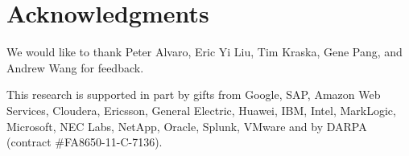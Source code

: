 \documentclass[preprint]{acm_proc_article-sp}
\begin{document}

\section{Acknowledgments}
We would like to thank Peter Alvaro, Eric Yi Liu, Tim Kraska, Gene Pang, and Andrew Wang for feedback.

This research is supported in part by gifts from Google, SAP, Amazon Web Services, Cloudera, Ericsson, General Electric, Huawei, IBM, Intel, MarkLogic, Microsoft, NEC Labs, NetApp, Oracle, Splunk, VMware and by DARPA (contract \#FA8650-11-C-7136).




\balancecolumns
\end{document}
